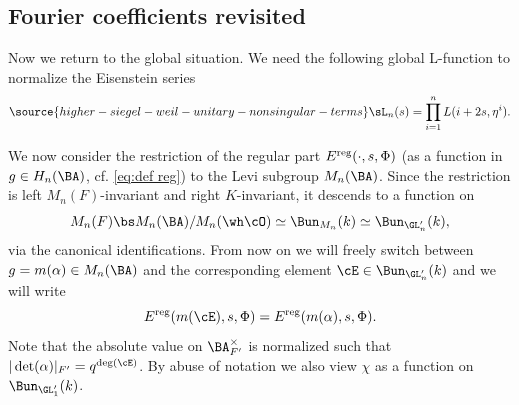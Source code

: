 

%








\subsection{Fourier coefficients revisited}\label{ss:FC} Now we return to the global situation.
We need the following global L-function to normalize the Eisenstein series
\begin{equation}\label{eq: L-factor}
\source{higher-siegel-weil-unitary-nonsingular-terms}
\sL_n(s)=\prod_{i=1}^nL(i+2s, \eta^i).
\end{equation}


We now consider the restriction of the regular part  $E^{\rm reg}(\cdot,s,\Phi)$ (as a function in $g\in H_n(\BA)$, cf. \eqref{eq:def reg}) to the Levi subgroup $M_n(\BA)$. Since the restriction is left $M_n(F)$-invariant and right $K$-invariant, it descends to a function on
$$M_n(F)\bs M_n(\BA)/M_n(\wh\cO)\simeq \Bun_{M_n}(k)\simeq \Bun_{\GL_n'}(k),
$$
via the canonical identifications.
From now on we will freely switch between $g=m(\alpha)\in M_n(\BA)$ and the corresponding element $\cE\in  \Bun_{\GL_n'}(k)$ and we will write
$$
E^{\rm reg}(m(\cE),s,\Phi)=E^{\rm reg}(m(\alpha),s,\Phi).
$$
Note that the absolute value on $\BA_{F'}^\times$ is normalized such that $|\det(\alpha)|_{F'}=q^{\deg(\cE)}$.
By abuse of notation we also view $\chi$ as a function on $\Bun_{\GL_1'}(k)$.

